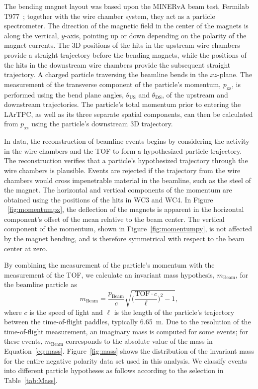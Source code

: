 \documentclass[%
 floatfix,
 reprint,
 twocolumn,
superscriptaddress,
showpacs,preprintnumbers,
 amsmath,amssymb,
 aps,
prd,
]{revtex4-1}
\begin{document}
The bending magnet layout was based upon the MINERvA beam test, Fermilab T977~\cite{MinervaTestbeam}; together with the wire chamber system, they act as a particle spectrometer. The direction of the magnetic field in the center of the magnets is along the vertical, $y$-axis, pointing up or down depending on the polarity of the magnet currents. The 3D positions of the hits in the upstream wire chambers provide a straight trajectory before the bending magnets, while the positions of the hits in the downstream wire chambers provide the subsequent straight trajectory. A charged particle traversing the beamline bends in the $xz$-plane. The measurement of the transverse component of the particle's  momentum, $p_\text{xz}$, is performed using the bend plane angles, $\theta_{\textrm{US}}$ and $\theta_{\textrm{DS}}$, of the upstream and downstream trajectories. The particle's total momentum prior to entering the LArTPC, as well as its three separate spatial components, can then be calculated from $p_\text{xz}$ using the particle's downstream 3D trajectory.

In data, the reconstruction of beamline events begins by considering the activity in the wire chambers and the TOF to form a hypothesized particle trajectory. The reconstruction verifies that a particle's hypothesized trajectory through the wire chambers is plausible. Events are rejected if the trajectory from the wire chambers would cross impenetrable material in the beamline, such as the steel of the magnet. The horizontal and vertical components of the momentum are obtained using the positions of the hits in WC3 and WC4. In Figure ~\ref{fig:momentumpx}, the deflection of the magnets is apparent in the horizontal component’s offset of the mean relative to the beam center. The vertical component of the momentum, shown in Figure~\ref{fig:momentumpy}, is not affected by the magnet bending, and is therefore symmetrical with respect to the beam center at zero. 

By combining the measurement of the particle's momentum with the measurement of the TOF, we calculate an invariant mass hypothesis, $m_{\text{Beam}}$, for the beamline particle as 
\begin{equation}
m_{\text{Beam}} = \frac{p_{\text{Beam}}}{c}\sqrt{\biggl(\frac{\text{TOF}\cdot c}{\ell}\biggr)^2 -1},
\label{eq:mass}
\end{equation}
where $c$ is the speed of light and $\ell$ is the length of the particle's trajectory between the time-of-flight paddles, typically 6.65~m. Due to the resolution of the time-of-flight measurement, an imaginary mass is computed for some events; for these events, $m_{\text{Beam}}$ corresponds to the absolute value of the mass in Equation~\ref{eq:mass}.
Figure~\ref{fig:mass} shows the distribution of the invariant mass for the entire negative polarity data set used in this analysis. We classify events into different particle hypotheses as follows according to the selection in Table~\ref{tab:Mass}.
\end{document}
